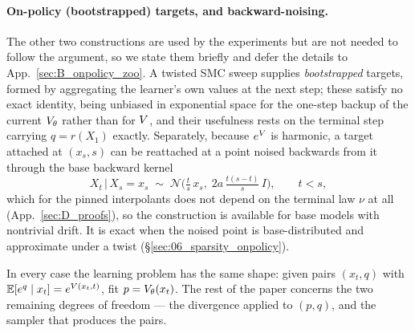 \paragraph{On-policy (bootstrapped) targets, and backward-noising.}
The other two constructions are used by the experiments but are not needed to
follow the argument, so we state them briefly and defer the details to
App.~\ref{sec:B_onpolicy_zoo}. A twisted SMC sweep supplies \emph{bootstrapped}
targets, formed by aggregating the learner's own values at the next step; these
satisfy no exact identity, being unbiased in exponential space for the one-step
backup of the current $V_\theta$ rather than for $V$, and their usefulness
rests on the terminal step carrying $q=r(X_1)$ exactly. Separately, because
$e^{V}$ is harmonic, a target attached at $(x_s,s)$ can be reattached at a
point noised backwards from it through the base backward kernel
\begin{equation}
  X_t \,\big|\, X_s = x_s \;\sim\; \mathcal{N}\!\Big(\tfrac{t}{s}\,x_s,\;
    2a\,\tfrac{t(s-t)}{s}\,I\Big), \qquad t<s,
  \label{eq:backward-kernel}
\end{equation}
which for the pinned interpolants does not depend on the terminal law $\nu$ at
all (App.~\ref{sec:D_proofs}), so the construction is available for base models
with nontrivial drift. It is exact when the noised point is base-distributed
and approximate under a twist (\S\ref{sec:06_sparsity_onpolicy}).

\medskip
\noindent In every case the learning problem has the same shape: given pairs
$(x_t,q)$ with $\mathbb{E}[e^{q}\mid x_t] = e^{V(x_t,t)}$, fit $p=V_\theta(x_t)$.
The rest of the paper concerns the two remaining degrees of freedom --- the
divergence applied to $(p,q)$, and the sampler that produces the pairs.
